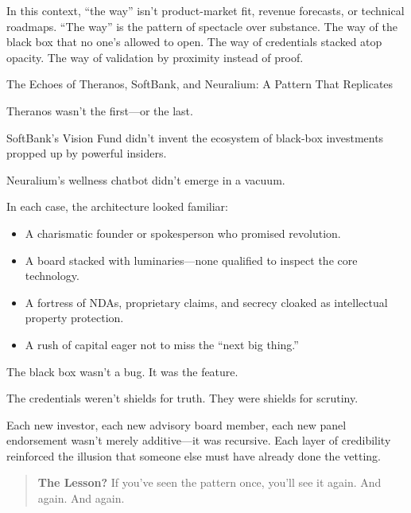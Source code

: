 In this context, “the way” isn’t product-market fit, revenue forecasts, or technical roadmaps.  
“The way” is the pattern of spectacle over substance.  
The way of the black box that no one’s allowed to open.  
The way of credentials stacked atop opacity.  
The way of validation by proximity instead of proof.

\medskip

\begin{HistoricalSidebar}{The Echoes of Theranos, SoftBank, and Neuralium: A Pattern That Replicates}

  Theranos wasn’t the first—or the last.  
  
  SoftBank’s Vision Fund didn’t invent the ecosystem of black-box investments propped up by powerful insiders.  
  
  Neuralium’s wellness chatbot didn’t emerge in a vacuum.

  \medskip
  
  In each case, the architecture looked familiar:
  
  \begin{itemize}
    \item A charismatic founder or spokesperson who promised revolution.
    \item A board stacked with luminaries—none qualified to inspect the core technology.
    \item A fortress of NDAs, proprietary claims, and secrecy cloaked as intellectual property protection.
    \item A rush of capital eager not to miss the “next big thing.”
  \end{itemize}

  \medskip
  
  The black box wasn’t a bug. It was the feature.

  The credentials weren’t shields for truth. They were shields for scrutiny.

  \medskip
  
  Each new investor, each new advisory board member, each new panel endorsement wasn’t merely additive—it was 
  recursive. Each layer of credibility reinforced the illusion that someone else must have already done the vetting.

  \medskip

  \begin{quote}
  \textbf{The Lesson?} If you’ve seen the pattern once, you’ll see it again. And again. And again.
  \end{quote}

\end{HistoricalSidebar}

